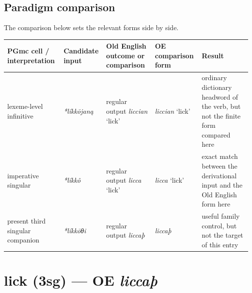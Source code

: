 \documentclass[
  british,
  a4paper,
  openany]{book}
\newcounter{none} %
\providecommand{\texorpdfstring}[2]{#1}
\begin{document}
\subsection{Paradigm comparison}\label{paradigm-comparison-24}

The comparison below sets the relevant forms side by side.

{\def\LTcaptype{none} %
\begin{longtable}[]{@{}
  >{\raggedright\arraybackslash}p{}
  >{\raggedright\arraybackslash}p{}
  >{\raggedright\arraybackslash}p{}
  >{\raggedright\arraybackslash}p{}
  >{\raggedright\arraybackslash}p{}@{}}
\toprule\noalign{}
\begin{minipage}[b]{\linewidth}\raggedright
PGmc cell / interpretation
\end{minipage} & \begin{minipage}[b]{\linewidth}\raggedright
Candidate input
\end{minipage} & \begin{minipage}[b]{\linewidth}\raggedright
Old English outcome or comparison
\end{minipage} & \begin{minipage}[b]{\linewidth}\raggedright
OE comparison form
\end{minipage} & \begin{minipage}[b]{\linewidth}\raggedright
Result
\end{minipage} \\
\midrule\noalign{}
\endhead
\bottomrule\noalign{}
\endlastfoot
lexeme-level infinitive & {\emph{*líkkōjaną}} & regular output
{\emph{liccian}} `lick' & {\emph{liccian}} `lick' & ordinary dictionary
headword of the verb, but not the finite form compared here \\
imperative singular & {\emph{*líkkô}} & regular output {\emph{licca}}
`lick' & {\emph{licca}} `lick' & exact match between the derivational
input and the Old English form here \\
present third singular companion & {\emph{*líkkōθi}} & regular output
{\emph{liccaþ}} & {\emph{liccaþ}} & useful family control, but not the
target of this entry \\
\end{longtable}
}

\section{\texorpdfstring{lick (3sg) --- OE
\emph{liccaþ}}{lick (3sg) --- OE liccaþ}}\label{lick-3sg-oe-liccauxfe}
\end{document}
